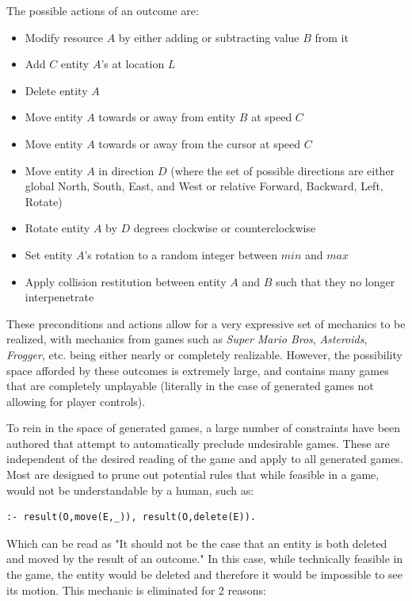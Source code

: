 \documentclass[a4paper]{article}
\begin{document}
The possible actions of an outcome are:

\begin{itemize}
\item Modify resource $A$ by either adding or subtracting value $B$ from it
\item Add $C$ entity $A$'s at location $L$
\item Delete entity $A$
\item Move entity $A$ towards or away from entity $B$ at speed $C$
\item Move entity $A$ towards or away from the cursor at speed $C$
\item Move entity $A$ in direction $D$ (where the set of possible directions are either global North, South, East, and West or relative Forward, Backward, Left, Rotate)
\item Rotate entity $A$ by $D$ degrees clockwise or counterclockwise
\item Set entity $A$'s rotation to a random integer between $min$ and $max$
\item Apply collision restitution between entity $A$ and $B$ such that they no longer interpenetrate
\end{itemize}

These preconditions and actions allow for a very expressive set of mechanics to be realized, with mechanics from games such as \textit{Super Mario Bros}, \textit{Asteroids}, \textit{Frogger}, etc. being either nearly or completely realizable.  However, the possibility space afforded by these outcomes is extremely large, and contains many games that are completely unplayable (literally in the case of generated games not allowing for player controls).  

To rein in the space of generated games, a large number of constraints have been authored that attempt to automatically preclude undesirable games.  These are independent of the desired reading of the game and apply to all generated games.  Most are designed to prune out potential rules that while feasible in a game, would not be understandable by a human, such as:


\begin{verbatim} 
:- result(O,move(E,_)), result(O,delete(E)).
\end{verbatim}
   
Which can be read as "It should not be the case that an entity is both deleted and moved by the result of an outcome."  In this case, while technically feasible in the game, the entity would be deleted and therefore it would be impossible to see its motion.  This mechanic is eliminated for 2 reasons:
\end{document}

